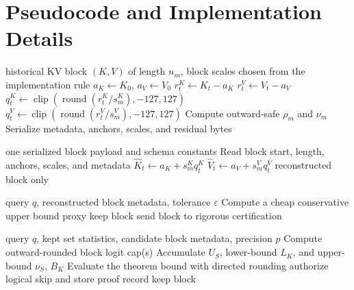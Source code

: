 \section{Pseudocode and Implementation Details}
\label{app:pseudocode}

\begin{algorithm}[h]
\caption{Block-local encoding}
\begin{algorithmic}[1]
\Require historical KV block $(K,V)$ of length $n_m$, block scales chosen from the implementation rule
\State $a_K \gets K_0$, $a_V \gets V_0$
  \State $r^K_t \gets K_t - a_K$
  \State $r^V_t \gets V_t - a_V$
  \State $q^K_t \gets \operatorname{clip}(\operatorname{round}(r^K_t / s^K_m), -127, 127)$
  \State $q^V_t \gets \operatorname{clip}(\operatorname{round}(r^V_t / s^V_m), -127, 127)$
\EndFor
\State Compute outward-safe $\rho_m$ and $\nu_m$
\State Serialize metadata, anchors, scales, and residual bytes
\end{algorithmic}
\end{algorithm}

\begin{algorithm}[h]
\caption{Independent block decoding}
\begin{algorithmic}[1]
\Require one serialized block payload and schema constants
\State Read block start, length, anchors, scales, and metadata
  \State $\hat{K}_t \gets a_K + s^K_m q^K_t$
  \State $\hat{V}_t \gets a_V + s^V_m q^V_t$
\EndFor
\State \Return reconstructed block only
\end{algorithmic}
\end{algorithm}

\begin{algorithm}[h]
\caption{Query-dependent candidate prefilter}
\begin{algorithmic}[1]
\Require query $q$, reconstructed block metadata, tolerance $\varepsilon$
  \State Compute a cheap conservative \fp{} upper bound proxy
    \State keep block
  \Else
    \State send block to rigorous \mpfr{} certification
  \EndIf
\EndFor
\end{algorithmic}
\end{algorithm}

\begin{algorithm}[h]
\caption{Rigorous MPFR skip certification}
\begin{algorithmic}[1]
\Require query $q$, kept set statistics, candidate block metadata, precision $p$
\State Compute outward-rounded block logit cap(s)
\State Accumulate $U_S$, lower-bound $L_K$, and upper-bound $\nu_S$, $B_K$
\State Evaluate the theorem bound with directed rounding
  \State authorize logical skip and store proof record
\Else
  \State keep block
\EndIf
\end{algorithmic}
\end{algorithm}

